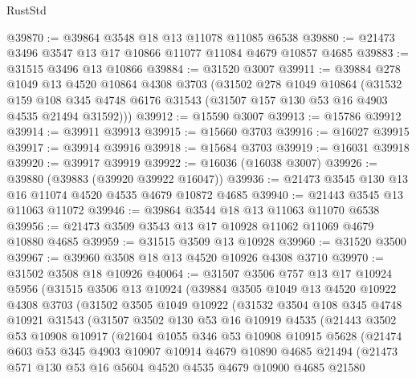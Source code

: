 \begin{lexlean}{RustStd}
\begin{coremodule}
@39870 := @39864 @3548 @18 @13 @11078 @11085 @6538
@39880 := @21473 @3496 @3547 @13 @17 @10866 @11077 @11084 @4679 @10857 @4685
@39883 := @31515 @3496 @13 @10866
@39884 := @31520 @3007
@39911 := @39884
    @278
    @1049
    @13
    @4520
    @10864
    @4308
    @3703
    (@31502
      @278
      @1049
      @10864
      (@31532
        @159
        @108
        @345
        @4748
        @6176
        @31543
        (@31507 @157 @130 @53 @16 @4903 @4535 @21494 @31592)))
@39912 := @15590 @3007
@39913 := @15786 @39912
@39914 := @39911 @39913
@39915 := @15660 @3703
@39916 := @16027 @39915
@39917 := @39914 @39916
@39918 := @15684 @3703
@39919 := @16031 @39918
@39920 := @39917 @39919
@39922 := @16036 (@16038 @3007)
@39926 := @39880 (@39883 (@39920 @39922 @16047))
@39936 := @21473 @3545 @130 @13 @16 @11074 @4520 @4535 @4679 @10872 @4685
@39940 := @21443 @3545 @13 @11063 @11072
@39946 := @39864 @3544 @18 @13 @11063 @11070 @6538
@39956 := @21473 @3509 @3543 @13 @17 @10928 @11062 @11069 @4679 @10880 @4685
@39959 := @31515 @3509 @13 @10928
@39960 := @31520 @3500
@39967 := @39960 @3508 @18 @13 @4520 @10926 @4308 @3710
@39970 := @31502 @3508 @18 @10926
@40064 := @31507
    @3506
    @757
    @13
    @17
    @10924
    @5956
    (@31515
      @3506
      @13
      @10924
      (@39884
        @3505
        @1049
        @13
        @4520
        @10922
        @4308
        @3703
        (@31502
          @3505
          @1049
          @10922
          (@31532
            @3504
            @108
            @345
            @4748
            @10921
            @31543
            (@31507
              @3502
              @130
              @53
              @16
              @10919
              @4535
              (@21443
                @3502
                @53
                @10908
                @10917
                (@21604
                  @1055
                  @346
                  @53
                  @10908
                  @10915
                  @5628
                  (@21474
                    @603
                    @53
                    @345
                    @4903
                    @10907
                    @10914
                    @4679
                    @10890
                    @4685
                    @21494
                    (@21473
                      @571
                      @130
                      @53
                      @16
                      @5604
                      @4520
                      @4535
                      @4679
                      @10900
                      @4685
                      @21580

\end{coremodule}
\end{lexlean}
